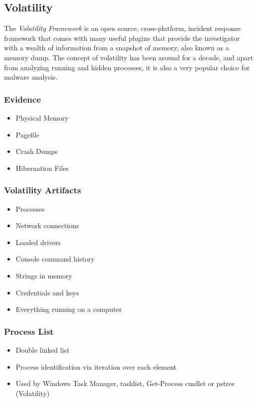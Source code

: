 

\subsection{Volatility}
The \textit{Volatility Framework} is an open source, cross-platform, incident response framework that comes with many useful plugins that provide the investigator with a wealth of information from a snapshot of memory, also known as a memory dump. The concept of volatility has been around for a decade, and apart from analyzing running and hidden processes, it is also a very popular choice for malware analysis.

\subsubsection{Evidence}
\begin{itemize}
    \item Physical Memory
    \item Pagefile
    \item Crash Dumps
    \item Hibernation Files
\end{itemize}

\subsubsection{Volatility Artifacts}
\begin{itemize}
    \item Processes
    \item Network connections
    \item Loaded drivers
    \item Console command history
    \item Strings in memory
    \item Credentials and keys
    \item Everything running on a computer
\end{itemize}

\subsubsection{Process List}
\begin{itemize}
    \item Double linked list
    \item Process identification via iteration over each element
    \item Used by Windows Task Manager, tasklist, Get-Process cmdlet or pstree (Volatility)
\end{itemize}

